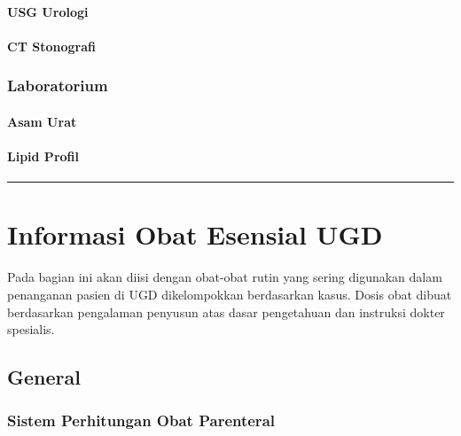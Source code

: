 \documentclass[
]{book}
\begin{document}
\hypertarget{usg-urologi}{%
\subsubsection{USG Urologi}\label{usg-urologi}}

\hypertarget{ct-stonografi}{%
\subsubsection{CT Stonografi}\label{ct-stonografi}}

\hypertarget{laboratorium}{%
\subsection{Laboratorium}\label{laboratorium}}

\hypertarget{asam-urat}{%
\subsubsection{Asam Urat}\label{asam-urat}}

\hypertarget{lipid-profil}{%
\subsubsection{Lipid Profil}\label{lipid-profil}}

\begin{center}\rule{0.5\linewidth}{0.5pt}\end{center}

\hypertarget{informasi-obat-esensial-ugd}{%
\chapter{Informasi Obat Esensial UGD}\label{informasi-obat-esensial-ugd}}

Pada bagian ini akan diisi dengan obat-obat rutin yang sering digunakan dalam penanganan pasien di UGD dikelompokkan berdasarkan kasus. Dosis obat dibuat berdasarkan pengalaman penyusun atas dasar pengetahuan dan instruksi dokter spesialis.

\hypertarget{general-1}{%
\section{General}\label{general-1}}

\hypertarget{sistem-perhitungan-obat-parenteral}{%
\subsection{Sistem Perhitungan Obat Parenteral}\label{sistem-perhitungan-obat-parenteral}}
\end{document}
